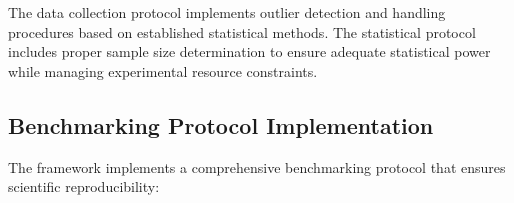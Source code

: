 
The data collection protocol implements outlier detection and handling procedures based on established statistical methods. The statistical protocol includes proper sample size determination to ensure adequate statistical power while managing experimental resource constraints.

\subsection{Benchmarking Protocol Implementation}

The framework implements a comprehensive benchmarking protocol that ensures scientific reproducibility:

    
        
        
        
